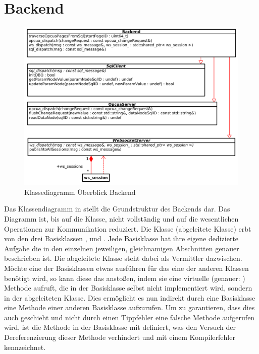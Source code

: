 \section{Backend}\label{sec:poc:backend}
\begin{figure}[ht]
  \centering
  \includegraphics[width=\textwidth]{content/hauptteil/umsetzungPoC/backend/uml/overview.pdf}
  \caption{Klassediagramm Überblick Backend}
  \label{fig:backend:classDiag:overview}
\end{figure}
Das Klassendiagramm in  stellt die Grundstruktur des Backends dar. 
Das Diagramm ist, bis auf die  Klasse, nicht vollständig und auf die wesentlichen Operationen zur Kommunikation reduziert. 
Die  Klasse (abgeleitete Klasse) erbt von den drei Basisklassen ,  und .
Jede Basisklasse hat ihre eigene dedizierte Aufgabe die in den einzelnen jeweiligen, gleichnamigen Abschnitten genauer beschrieben ist.
Die abgeleitete Klasse steht dabei als Vermittler dazwischen. Möchte eine der Basisklassen etwas ausführen für das eine der anderen Klassen benötigt wird, 
so kann diese das anstoßen, indem sie eine virtuelle (genauer: ) Methode aufruft, die in der Basisklasse selbst nicht implementiert wird, sondern in der abgeleiteten  Klasse.
Dies ermöglicht es nun indirekt durch eine Basisklasse eine Methode einer anderen Basisklasse aufzurufen.
Um zu garantieren, dass dies auch geschieht und nicht durch einen Tippfehler eine falsche Methode aufgerufen wird, 
ist die Methode in der Basisklasse mit  definiert, was den Versuch der Dereferenzierung dieser Methode verhindert und mit einem Kompilerfehler kennzeichnet.
